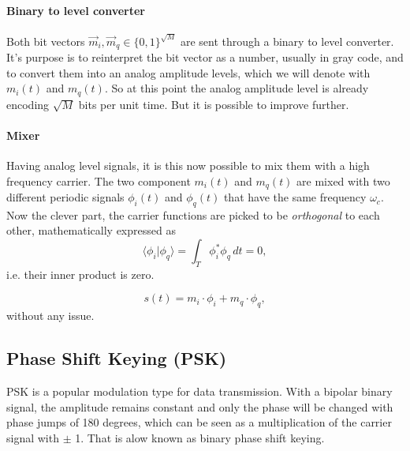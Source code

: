 \paragraph{Binary to level converter}


Both bit vectors \(\vec{m}_i, \vec{m}_q \in \{0,1\}^{\sqrt{M}}\) are sent through a binary to level converter. It's purpose is to reinterpret the bit vector as a number, usually in gray code, and to convert them into an analog amplitude levels, which we will denote with \(m_i(t)\) and \(m_q(t)\). So at this point the analog amplitude level is already encoding \(\sqrt{M}\) bits per unit time. But it is possible to improve further.


\paragraph{Mixer}

Having analog level signals, it is this now possible to mix them with a high frequency carrier. The two component \(m_i(t)\) and \(m_q(t)\) are mixed with two different periodic signals \(\phi_i(t)\) and \(\phi_q(t)\) that have the same frequency \(\omega_c\). Now the clever part, the carrier functions are picked to be \emph{orthogonal} to each other, mathematically expressed as 
\begin{equation}
	\langle \phi_i | \phi_q \rangle
	= \int_T \phi_i^* \phi_q \, dt
	= 0,
\end{equation}
i.e. their inner product is zero.

\begin{equation}
	s(t) = m_i\cdot\phi_i + m_q\cdot\phi_q,
\end{equation}
without any issue.

% 	

\subsection{Phase Shift Keying (PSK)}

PSK is a popular modulation type for data transmission\cite{Meyer2011}. With a bipolar binary signal, the amplitude remains constant and only the phase will be changed with phase jumps of 180 degrees, which can be seen as a multiplication of the carrier signal with $\pm$ 1. That is alow known as binary phase shift keying.

